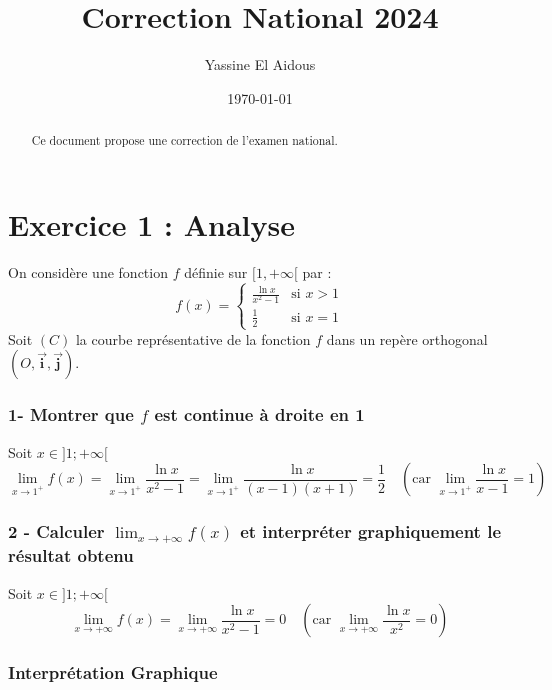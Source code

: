 \documentclass{article}
\title{Correction National 2024}
\author{Yassine El Aidous}
\date{\today}
\begin{document}
\maketitle

\begin{abstract}
    Ce document propose une correction de l'examen national.
\end{abstract}

\tableofcontents

\newpage

\section{Exercice 1 : Analyse}

On considère une fonction \( f \) définie sur \( [1, +\infty[ \) par :
\[
f(x) = 
\begin{cases}
    \frac{\ln x}{x^2 - 1} & \text{si } x > 1 \\
    \frac{1}{2} & \text{si } x = 1
\end{cases}
\]
Soit \( (C) \) la courbe représentative de la fonction \( f \) dans un repère orthogonal \( (O, \vec{\mathbf{i}}, \vec{\mathbf{j}}) \).

\hrulefill %

\subsubsection*{1- Montrer que \( f \) est continue à droite en 1}

Soit \( x \in ]1; +\infty[ \)
\[
\lim_{x \to 1^+} f(x) = \lim_{x \to 1^+} \frac{\ln x}{x^2 - 1} = \lim_{x \to 1^+} \frac{\ln x}{(x-1)(x+1)} = \frac{1}{2} \quad (\text{car } \lim_{x \to 1^+} \frac{\ln x}{x-1} = 1)
\]

\hrulefill %

\subsubsection*{2 - Calculer \( \lim_{x \to +\infty} f(x) \) et interpréter graphiquement le résultat obtenu}

Soit \( x \in ]1;+\infty[ \)
\[
\lim_{x \to +\infty} f(x) = \lim_{x \to +\infty} \frac{\ln x}{x^2 - 1} = 0 \quad (\text{car } \lim_{x \to +\infty} \frac{\ln x}{x^2} = 0)
\]

\subsubsection*{Interprétation Graphique}
\end{document}

